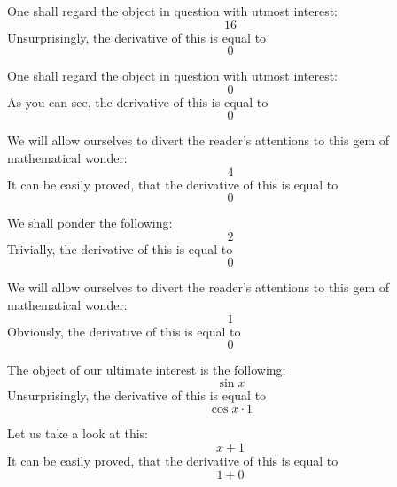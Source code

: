 \documentclass{article}
\begin{document}
One shall regard the object in question with utmost interest:
\begin{equation}
16 
\end{equation}
Unsurprisingly, the derivative of this is equal to
\begin{equation}
0 
\end{equation}

One shall regard the object in question with utmost interest:
\begin{equation}
0 
\end{equation}
As you can see, the derivative of this is equal to
\begin{equation}
0 
\end{equation}

We will allow ourselves to divert the reader's attentions to this gem of mathematical wonder:
\begin{equation}
4 
\end{equation}
It can be easily proved, that the derivative of this is equal to
\begin{equation}
0 
\end{equation}

We shall ponder the following:
\begin{equation}
2 
\end{equation}
Trivially, the derivative of this is equal to
\begin{equation}
0 
\end{equation}

We will allow ourselves to divert the reader's attentions to this gem of mathematical wonder:
\begin{equation}
1 
\end{equation}
Obviously, the derivative of this is equal to
\begin{equation}
0 
\end{equation}

The object of our ultimate interest is the following:
\begin{equation}
\sin x 
\end{equation}
Unsurprisingly, the derivative of this is equal to
\begin{equation}
\cos x \cdot 1 
\end{equation}

Let us take a look at this:
\begin{equation}
x + 1 
\end{equation}
It can be easily proved, that the derivative of this is equal to
\begin{equation}
1 + 0 
\end{equation}
\end{document}
